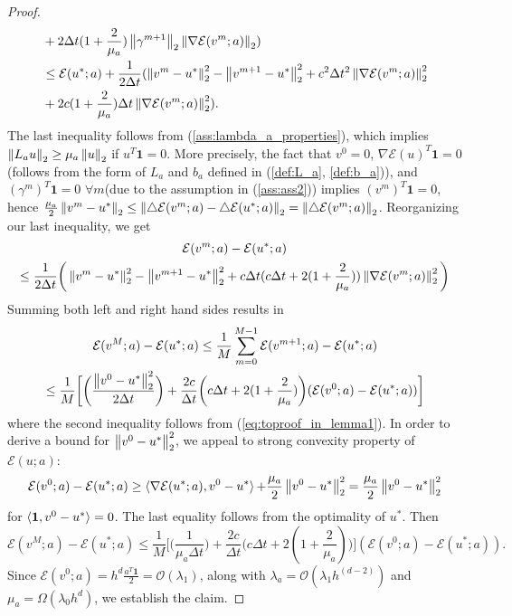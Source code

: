 \begin{thm}
\begin{proof}
\begin{align*}
		&+ 2\Delta t (1+ \frac{2}{\mu_a}) \left\lVert\gamma^{m+1}\right\rVert_{2} \left\lVert\nabla \mathcal{E}(v^m;a)\right\rVert_{2})\\
		&\leq \mathcal{E}(u^*;a) + \frac{1}{2 \Delta t}(\left\lVert v^m-u^*\right\rVert_{2}^{2} - \left\lVert v^{m+1} - u^*\right\rVert_{2}^{2} + c^2 \Delta t^2 \left\lVert\nabla \mathcal{E}(v^m;a)\right\rVert_{2}^{2}\\
		&+ 2c (1+ \frac{2}{\mu_a}) \Delta t \left\lVert\nabla \mathcal{E}(v^m;a)\right\rVert_{2}^{2}).
		\end{align*}
		The last inequality follows from (\ref{ass:lambda_a_properties}), which implies $\left\lVert L_a u\right\rVert_{2} \geq \mu_a \left\lVert u\right\rVert_{2}$ if $u^T\textbf{1}=0$. More precisely, the fact that $v^0 = 0$, $\nabla\mathcal{E}(u)^T \mathbf{1} = 0$ (follows from the form of $L_a$ and $b_a$ defined in (\ref{def:L_a}, \ref{def:b_a})), and $(\gamma^m)^T \textbf{1} = 0$ $\forall m$(due to the assumption in (\ref{ass:ass2})) implies $(v^m)^T \textbf{1} = 0$, hence $\frac{\mu_a}{2} \left\lVert v^m - u^*\right\rVert_{2} \leq \left\lVert\triangle \mathcal{E}(v^m;a) - \triangle \mathcal{E}(u^*;a)\right\rVert_{2} = \left\lVert\triangle \mathcal{E}(v^m;a)\right\rVert_{2}$. Reorganizing our last inequality, we get
		\begin{multline}
		\mathcal{E}(v^m;a) - \mathcal{E}(u^*;a) \\
		\leq \frac{1}{2\Delta t} \bigg(\left\lVert v^m - u^*\right\rVert_{2}^{2} - \left\lVert v^{m+1} - u^*\right\rVert_{2}^{2} +c\Delta t (c\Delta t + 2(1+\frac{2}{\mu_a})) \left\lVert\nabla \mathcal{E}(v^m;a)\right\rVert_{2}^{2} \bigg)
		\end{multline}
		Summing both left and right hand sides results in 
		\begin{multline}
		\mathcal{E}(v^{M};a) - \mathcal{E}(u^*;a) \leq \frac{1}{M} \sum_{m = 0}^{M-1} \mathcal{E}(v^{m+1};a) - \mathcal{E}(u^*;a) \\
		\leq \frac{1}{M} \bigg[ \bigg( \frac{\left\lVert v^0 - u^*\right\rVert_{2}^{2}}{2\Delta t}\bigg) + \frac{2c}{\Delta t} \bigg(c\Delta t + 2(1+\frac{2}{\mu_a})\bigg) (\mathcal{E}(v^0;a) - \mathcal{E}(u^*;a)) \bigg]
		\end{multline}
		where the second inequality follows from (\ref{eq:toproof_in_lemma1}). In order to derive a bound for $\left\lVert v^0 - u^*\right\rVert_{2}^{2}$, we appeal to strong convexity property of $\mathcal{E}(u;a)$:
		\begin{equation*}
		\mathcal{E}(v^0;a) - \mathcal{E}(u^*;a) \geq \mathop{\langle \nabla \mathcal{E}(u^*;a), v^0 - u^* \rangle} + \frac{\mu_a}{2} \left\lVert v^0 - u^*\right\rVert_{2}^{2} = \frac{\mu_a}{2} \left\lVert v^0 - u^*\right\rVert_{2}^{2}
		\end{equation*}
		for $\mathop{\langle \textbf{1}, v^0 - u^* \rangle} = 0$. The last equality follows from the optimality of $u^*$. Then
		\begin{equation}
		\mathcal{E}(v^{M};a) - \mathcal{E}(u^*;a) \leq \frac{1}{M} \bigg[ \bigg(\frac{1}{\mu_a \Delta t}\bigg)+ \frac{2c}{\Delta t} \bigg(c\Delta t + 2(1+\frac{2}{\mu_a})\bigg)\bigg] (\mathcal{E}(v^0;a) - \mathcal{E}(u^*;a)).
		\end{equation}
		Since $\mathcal{E}(v^0;a) = h^d \frac{a^T \textbf{1}}{2} = \mathcal{O}(\lambda_{1})$, along with $\lambda_{a} = \mathcal{O}(\lambda_{1} h^(d-2))$ and $\mu_a = \Omega(\lambda_{0} h^d)$, we establish the claim.
	\end{proof}
\end{thm}
